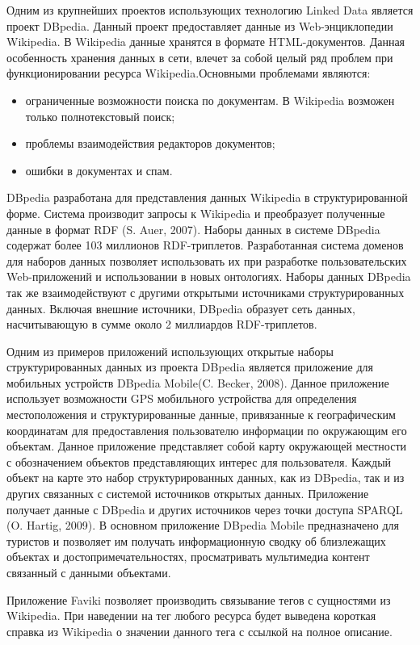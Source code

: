 Одним из крупнейших проектов использующих технологию Linked Data является проект DBpedia. Данный проект предоставляет данные из Web-энциклопедии Wikipedia. В Wikipedia данные хранятся в формате HTML-документов. Данная особенность хранения данных в сети, влечет за собой целый ряд проблем при функционировании ресурса Wikipedia.Основными проблемами являются:

\begin{itemize}
\item ограниченные возможности поиска по документам. В Wikipedia возможен только полнотекстовый поиск;
\item проблемы взаимодействия редакторов документов;
\item ошибки в документах и спам.
\end{itemize}

DBpedia разработана для представления данных Wikipedia в структурированной форме. Система производит запросы к Wikipedia и преобразует полученные данные в формат RDF (S. Auer, 2007). Наборы данных в системе DBpedia содержат более 103 миллионов RDF-триплетов. Разработанная система доменов для наборов данных позволяет использовать их при разработке пользовательских Web-приложений и использовании в новых онтологиях. Наборы данных DBpedia так же взаимодействуют с другими открытыми источниками структурированных данных. Включая внешние источники,  DBpedia образует сеть данных, насчитывающую в сумме около 2 миллиардов RDF-триплетов.  

Одним из примеров приложений использующих открытые наборы структурированных данных из проекта DBpedia является приложение для мобильных устройств DBpedia Mobile(C. Becker, 2008). Данное приложение использует возможности GPS мобильного устройства для определения местоположения и структурированные данные, привязанные к географическим координатам для предоставления пользователю информации по окружающим его объектам. Данное приложение представляет собой карту окружающей местности с обозначением объектов представляющих интерес для пользователя. Каждый объект на карте это набор структурированных данных, как из DBpedia, так и из других связанных с системой источников открытых данных. Приложение получает данные с DBpedia и других источников через точки доступа SPARQL (O. Hartig, 2009). В основном приложение DBpedia Mobile предназначено для туристов и позволяет им получать информационную сводку об близлежащих объектах и достопримечательностях, просматривать мультимедиа контент связанный с данными объектами. 

Приложение Faviki позволяет производить связывание тегов с сущностями из Wikipedia. При наведении на тег любого ресурса будет выведена короткая справка из Wikipedia о значении данного тега с ссылкой на полное описание. 


